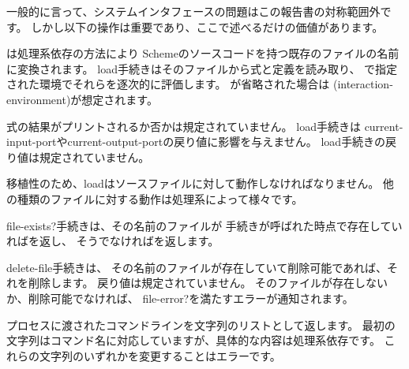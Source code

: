 一般的に言って、システムインタフェースの問題はこの報告書の対称範囲外です。
しかし以下の操作は重要であり、ここで述べるだけの価値があります。


\begin{entry}{%
}

は処理系依存の方法により
Schemeのソースコードを持つ既存のファイルの名前に変換されます。
{\cf load}手続きはそのファイルから式と定義を読み取り、
で指定された環境でそれらを逐次的に評価します。
が省略された場合は
{\cf (interaction-environment)}が想定されます。

式の結果がプリントされるか否かは規定されていません。
{\cf load}手続きは
{\cf current-input-port}や{\cf current-output-port}の戻り値に影響を与えません。
{\cf load}手続きの戻り値は規定されていません。


\begin{rationale}
移植性のため、{\cf load}はソースファイルに対して動作しなければなりません。
他の種類のファイルに対する動作は処理系によって様々です。
\end{rationale}
\end{entry}

\begin{entry}{%
}

{\cf file-exists?}手続きは、その名前のファイルが
手続きが呼ばれた時点で存在していれば\schtrue{}を返し、
そうでなければ\schfalse{}を返します。

\end{entry}

\begin{entry}{%
}

{\cf delete-file}手続きは、
その名前のファイルが存在していて削除可能であれば、それを削除します。
戻り値は規定されていません。
そのファイルが存在しないか、削除可能でなければ、
{\cf file-error?}を満たすエラーが通知されます。

\end{entry}

\begin{entry}{%
}

プロセスに渡されたコマンドラインを文字列のリストとして返します。
最初の文字列はコマンド名に対応していますが、具体的な内容は処理系依存です。
これらの文字列のいずれかを変更することはエラーです。
\end{entry}

